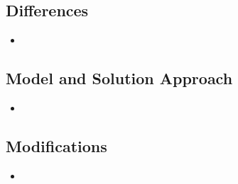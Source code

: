 \documentclass[a4paper]{article}
\begin{document}
\subsection{Differences}
\begin{itemize}[label=\textcolor{myYellow}{\textbullet},leftmargin=*,itemsep=-0.1em]
	\item 
\end{itemize}

\subsection{Model and Solution Approach}
\begin{itemize}[label=\textcolor{myYellow}{\textbullet},leftmargin=*,itemsep=-0.1em]
	\item 
\end{itemize}	

\subsection{Modifications}
\begin{itemize}[label=\textcolor{myYellow}{\textbullet},leftmargin=*,itemsep=-0.1em]
	\item 
\end{itemize}
\end{document}

